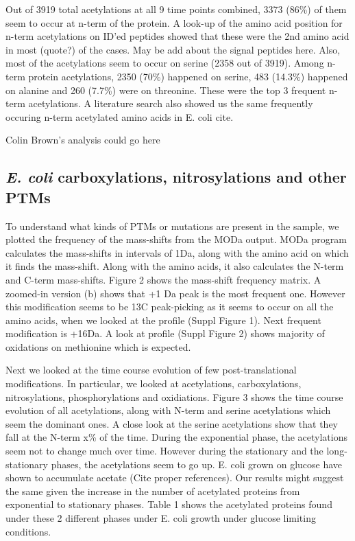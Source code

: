 \documentclass[12pt]{article}
\begin{document}
Out of 3919 total acetylations at all 9 time points combined, 3373 (86\%) of them seem to occur at n-term of the protein. A look-up of the amino acid position for n-term acetylations on ID'ed peptides showed that these were the 2nd amino acid in most (quote?) of the cases. {May be add about the signal peptides here}. Also, most of the acetylations seem to occur on serine (2358 out of 3919). Among n-term protein acetylations, 2350 (70\%) happened on serine, 483 (14.3\%) happened on alanine and 260 (7.7\%) were on threonine. These were the top 3 frequent n-term acetylations. A literature search also showed us the same frequently occuring n-term acetylated amino acids in E. coli {cite}.

{Colin Brown's analysis could go here}

\subsection{\emph{E. coli} carboxylations, nitrosylations and other PTMs}
To understand what kinds of PTMs or mutations are present in the sample, we plotted the frequency of the mass-shifts from the MODa output. MODa program calculates the mass-shifts in intervals of 1Da, along with the amino acid on which it finds the mass-shift. Along with the amino acids, it also calculates the N-term and C-term mass-shifts. Figure 2 shows the mass-shift frequency matrix. A zoomed-in version (b) shows that +1 Da peak is the most frequent one. However this modification seems to be 13C peak-picking as it seems to occur on all the amino acids, when we looked at the profile (Suppl Figure 1). Next frequent modification is +16Da. A look at profile (Suppl Figure 2) shows majority of oxidations on methionine which is expected.

Next we looked at the time course evolution of few post-translational modifications. In particular, we looked at acetylations, carboxylations, nitrosylations, phosphorylations and oxidiations. Figure 3 shows the time course evolution of all acetylations, along with N-term and serine acetylations which seem the dominant ones. A close look at the serine acetylations show that they fall at the N-term x\% of the time. During the exponential phase, the acetylations seem not to change much over time. However during the stationary and the long-stationary phases, the acetylations seem to go up. E. coli grown on glucose have shown to accumulate acetate (Cite proper references). Our results might suggest the same given the increase in the number of acetylated proteins from exponential to stationary phases. Table 1 shows the acetylated proteins found under these 2 different phases under E. coli growth under glucose limiting conditions.
\end{document}
